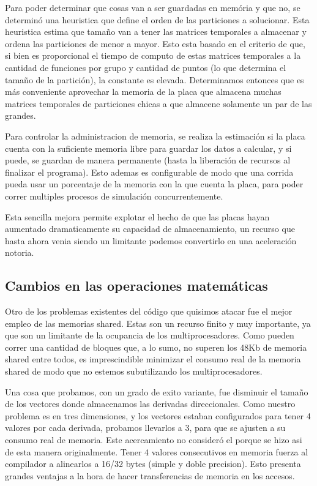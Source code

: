 Para poder determinar que cosas van a ser guardadas en mem\'oria y que no, se determin\'o una heuristica
que define el orden de las particiones a solucionar. Esta heuristica estima que tama\~no van a
tener las matrices temporales a almacenar y ordena las particiones de menor a mayor. Esto
esta basado en el criterio de que, si bien es proporcional el tiempo de computo de estas matrices
temporales a la cantidad de funciones por grupo y cantidad de puntos (lo que determina el tama\~no
de la partici\'on), la constante es elevada. Determinamos entonces que es m\'as conveniente
aprovechar la memoria de la placa que almacena muchas matrices temporales de particiones chicas
a que almacene solamente un par de las grandes.

Para controlar la administracion de memoria, se realiza la estimaci\'on si la placa cuenta
con la suficiente memoria libre para guardar los datos a calcular, y si puede, se guardan de manera
permanente (hasta la liberaci\'on de recursos al finalizar el programa). Esto ademas es configurable
de modo que una corrida pueda usar un porcentaje de la memoria con la que cuenta la placa, para
poder correr multiples procesos de simulaci\'on concurrentemente.

Esta sencilla mejora permite explotar el hecho de que las placas hayan aumentado dramaticamente su
capacidad de almacenamiento, un recurso que hasta ahora venia siendo un limitante podemos
convertirlo en una aceleraci\'on notoria.


\subsection{Cambios en las operaciones matem\'aticas}
Otro de los problemas existentes del c\'odigo que quisimos atacar fue el mejor empleo de las
memorias shared. Estas son un recurso finito y muy importante, ya que son un limitante de
la ocupancia de los multiprocesadores. Como pueden correr una cantidad de bloques que, a lo sumo,
no superen los 48Kb de memoria shared entre todos, es imprescindible minimizar el consumo real
de la memoria shared de modo que no estemos subutilizando los multiprocesadores.

Una cosa que probamos, con un grado de exito variante, fue disminuir el tamaño de los vectores
donde almacenamos las derivadas direccionales. Como nuestro problema es en tres dimensiones,
y los vectores estaban configurados para tener 4 valores por cada derivada, probamos llevarlos a
3, para que se ajusten a su consumo real de memoria. Este acercamiento no consider\'o el porque
se hizo asi de esta manera originalmente. Tener 4 valores consecutivos en memoria fuerza
al compilador a alinearlos a 16/32 bytes (simple y doble precision).
Esto presenta grandes ventajas a la hora de hacer transferencias de memoria en los accesos.

